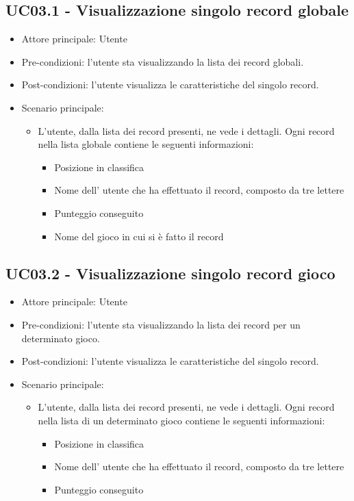 \subsection{UC03.1 - Visualizzazione singolo record globale}
\begin{itemize}
    \item Attore principale: Utente
    \item Pre-condizioni: l'utente sta visualizzando la lista dei record globali.
    \item Post-condizioni: l'utente visualizza le caratteristiche del singolo record.
    \item Scenario principale: \begin{itemize}
        \item L'utente, dalla lista dei record presenti, ne vede i dettagli. Ogni record nella lista globale contiene le seguenti informazioni: \begin{itemize}
            \item Posizione in classifica
            \item Nome dell' utente che ha effettuato il record, composto da tre lettere
            \item Punteggio conseguito
            \item Nome del gioco in cui si è fatto il record
        \end{itemize}
    \end{itemize}
\end{itemize}

\subsection{UC03.2 - Visualizzazione singolo record gioco}
\begin{itemize}
    \item Attore principale: Utente
    \item Pre-condizioni: l'utente sta visualizzando la lista dei record per un determinato gioco.
    \item Post-condizioni: l'utente visualizza le caratteristiche del singolo record.
    \item Scenario principale: \begin{itemize}
        \item L'utente, dalla lista dei record presenti, ne vede i dettagli. Ogni record nella lista di un determinato gioco contiene le seguenti informazioni: \begin{itemize}
            \item Posizione in classifica
            \item Nome dell' utente che ha effettuato il record, composto da tre lettere
            \item Punteggio conseguito
        \end{itemize}
    \end{itemize}
\end{itemize}

